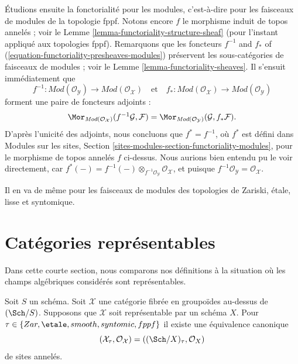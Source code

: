 \medskip\noindent
Étudions ensuite la fonctorialité pour les modules, c'est-à-dire pour les faisceaux de modules
de la topologie fppf. Notons encore $f$ le morphisme induit de topos
annelés ; voir le
Lemme \ref{lemma-functoriality-structure-sheaf}
(pour l'instant appliqué aux topologies fppf). Remarquons que les foncteurs
$f^{-1}$ and $f_*$ of (\ref{equation-functoriality-presheaves-modules})
préservent les sous-catégories de faisceaux de modules ; voir le
Lemme \ref{lemma-functoriality-sheaves}.
Il s'ensuit immédiatement que
\begin{equation}
\label{equation-functoriality-sheaves-modules}
f^{-1} :
\textit{Mod}(\mathcal{O}_\mathcal{Y})
\longrightarrow
\textit{Mod}(\mathcal{O}_\mathcal{X})
\quad\text{et}\quad
f_* :
\textit{Mod}(\mathcal{O}_\mathcal{X})
\longrightarrow
\textit{Mod}(\mathcal{O}_\mathcal{Y})
\end{equation}
forment une paire de foncteurs adjoints :
$$
\Mor_{\textit{Mod}(\mathcal{O}_\mathcal{X})}(
f^{-1}\mathcal{G}, \mathcal{F})
=
\Mor_{\textit{Mod}(\mathcal{O}_\mathcal{Y})}(
\mathcal{G}, f_*\mathcal{F}).
$$
D'après l'unicité des adjoints, nous concluons que
$f^* = f^{-1}$, où $f^*$ est défini dans
Modules sur les sites, Section \ref{sites-modules-section-functoriality-modules},
pour le morphisme de topos annelés $f$ ci-dessus. Nous aurions bien entendu pu
le voir directement, car
$f^*(-) = f^{-1}(-) \otimes_{f^{-1}\mathcal{O}_\mathcal{Y}}
\mathcal{O}_\mathcal{X}$, et puisque
$f^{-1}\mathcal{O}_\mathcal{Y} = \mathcal{O}_\mathcal{X}$.

\medskip\noindent
Il en va de même pour les faisceaux de modules des topologies de Zariski, étale, lisse et
syntomique.



\section{Catégories représentables}
\label{section-representable}

\noindent
Dans cette courte section, nous comparons nos définitions à la situation
où les champs algébriques considérés sont représentables.

\begin{lemma}
\label{lemma-compare-with-scheme}
Soit $S$ un schéma. Soit $\mathcal{X}$ une catégorie fibrée
en groupoïdes au-dessus de $(\Sch/S)$. Supposons que $\mathcal{X}$ soit représentable
par un schéma $X$. Pour $\tau \in \{Zar,\linebreak[0] \etale,\linebreak[0]
smooth,\linebreak[0] syntomic,\linebreak[0] fppf\}$
il existe une équivalence canonique
$$
(\mathcal{X}_\tau, \mathcal{O}_\mathcal{X}) =
((\Sch/X)_\tau, \mathcal{O}_X)
$$
de sites annelés.
\end{lemma}

